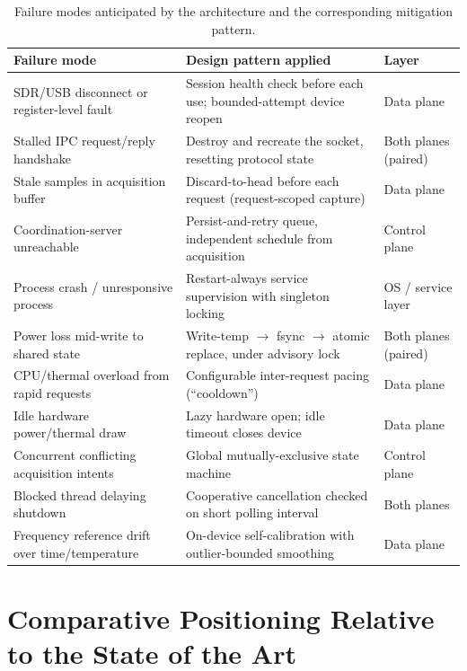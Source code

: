 \documentclass[11pt,a4paper]{article}
\begin{document}
\begin{table}[H]
\centering
\small
\begin{tabular}{@{}p{4.6cm}p{4.6cm}p{5cm}@{}}
\toprule
\textbf{Failure mode} & \textbf{Design pattern applied} & \textbf{Layer} \\
\midrule
SDR/USB disconnect or register-level fault & Session health check before each use; bounded-attempt device reopen & Data plane \\
Stalled IPC request/reply handshake & Destroy and recreate the socket, resetting protocol state & Both planes (paired) \\
Stale samples in acquisition buffer & Discard-to-head before each request (request-scoped capture) & Data plane \\
Coordination-server unreachable & Persist-and-retry queue, independent schedule from acquisition & Control plane \\
Process crash / unresponsive process & Restart-always service supervision with singleton locking & OS / service layer \\
Power loss mid-write to shared state & Write-temp $\rightarrow$ fsync $\rightarrow$ atomic replace, under advisory lock & Both planes (paired) \\
CPU/thermal overload from rapid requests & Configurable inter-request pacing (``cooldown'') & Data plane \\
Idle hardware power/thermal draw & Lazy hardware open; idle timeout closes device & Data plane \\
Concurrent conflicting acquisition intents & Global mutually-exclusive state machine & Control plane \\
Blocked thread delaying shutdown & Cooperative cancellation checked on short polling interval & Both planes \\
Frequency reference drift over time/temperature & On-device self-calibration with outlier-bounded smoothing & Data plane \\
\bottomrule
\end{tabular}
\caption{Failure modes anticipated by the architecture and the corresponding mitigation pattern.}
\label{tab:reliability}
\end{table}

\section{Comparative Positioning Relative to the State of the Art}
\end{document}
